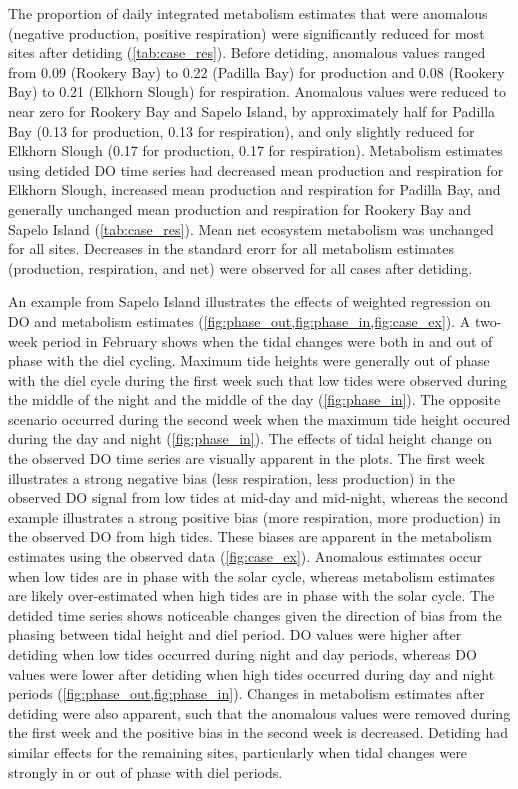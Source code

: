 \documentclass[letterpaper,12pt,oneside]{article}\usepackage[]{graphicx}\usepackage[]{color}
\begin{document}
The proportion of daily integrated metabolism estimates that were anomalous (negative production, positive respiration) were significantly reduced for most sites after detiding (\cref{tab:case_res}).  Before detiding, anomalous values ranged from 0.09 (Rookery Bay) to 0.22 (Padilla Bay) for production and 0.08 (Rookery Bay) to 0.21 (Elkhorn Slough) for respiration. Anomalous values were reduced to near zero for Rookery Bay and Sapelo Island, by approximately half for Padilla Bay (0.13 for production, 0.13 for respiration), and only slightly reduced for Elkhorn Slough (0.17 for production, 0.17 for respiration).  Metabolism estimates using detided \ac{DO} time series had decreased mean production and respiration for Elkhorn Slough, increased mean production and respiration for Padilla Bay, and generally unchanged mean production and respiration for Rookery Bay and Sapelo Island (\cref{tab:case_res}).  Mean net ecosystem metabolism was unchanged for all sites.  Decreases in the standard erorr for all metabolism estimates (production, respiration, and net) were observed for all cases after detiding.  

An example from Sapelo Island illustrates the effects of weighted regression on \ac{DO} and metabolism estimates (\cref{fig:phase_out,fig:phase_in,fig:case_ex}).   A two-week period in February shows when the tidal changes were both in and out of phase with the diel cycling.  Maximum tide heights were generally out of phase with the diel cycle during the first week such that low tides were observed during the middle of the night and the middle of the day (\cref{fig:phase_in}).  The opposite scenario occurred during the second week when the maximum tide height occured during the day and night (\cref{fig:phase_in}).  The effects of tidal height change on the observed \ac{DO} time series are visually apparent in the plots. The first week illustrates a strong negative bias (less respiration, less production) in the observed \ac{DO} signal from low tides at mid-day and mid-night, whereas the second example illustrates a strong positive bias (more respiration, more production) in the observed \ac{DO} from high tides. These biases are apparent in the metabolism estimates using the observed data (\cref{fig:case_ex}).  Anomalous estimates occur when low tides are in phase with the solar cycle, whereas metabolism estimates are likely over-estimated when high tides are in phase with the solar cycle.  The detided time series shows noticeable changes given the direction of bias from the phasing between tidal height and diel period.  \ac{DO} values were higher after detiding when low tides occurred during night and day periods, whereas \ac{DO} values were lower after detiding when high tides occurred during day and night periods (\cref{fig:phase_out,fig:phase_in}).  Changes in metabolism estimates after detiding were also apparent, such that the anomalous values were removed during the first week and the positive bias in the second week is decreased.  Detiding had similar effects for the remaining sites, particularly when tidal changes were strongly in or out of phase with diel periods. 
\end{document}
